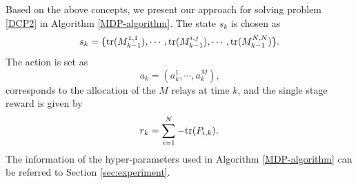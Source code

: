 \documentclass[twocolumn]{IEEEtran}
\newcommand{\tr}{{\rm tr}}
\begin{document}
Based on the above concepts, we present our approach for solving problem \eqref{DCP2} in Algorithm \ref{MDP-algorithm}. 
The state $s_k$ is chosen as
\begin{equation*}
s_{k}=\{\tr(M_{k-1}^{1,1}),\cdots,\tr (M_{k-1}^{i,j}),\cdots,\tr (M_{k-1}^{N,N})\}.
\end{equation*}
The action is set as
\begin{equation*}
a_k=(a^{1}_{k},\cdots,a^{M}_{k}) \text{,}
\end{equation*}
corresponds to the allocation of the $M$ relays at time $k$, and the single stage reward is given by
\begin{equation*}
r_k=\sum_{i=1}^{N}-\tr(P_{i,k}) .
\end{equation*}
The information of the hyper-parameters used in Algorithm \ref{MDP-algorithm} can be referred to Section \ref{sec:experiment}.
\end{document}

